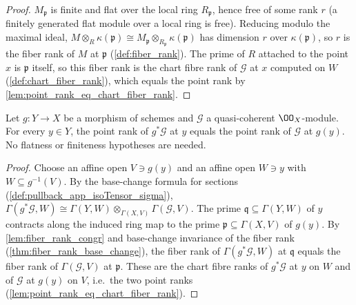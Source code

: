 \begin{proof}
  \leanok
  \(M_{\mathfrak p}\) is finite and flat over the local ring
  \(R_{\mathfrak p}\), hence free of some rank \(r\) (a finitely generated
  flat module over a local ring is free).  Reducing modulo the maximal
  ideal,
  \(M \otimes_R \kappa(\mathfrak p)
    \cong M_{\mathfrak p} \otimes_{R_{\mathfrak p}} \kappa(\mathfrak p)\)
  has dimension \(r\) over \(\kappa(\mathfrak p)\), so \(r\) is the fiber
  rank of \(M\) at \(\mathfrak p\) (\cref{def:fiber_rank}).  The prime of
  \(R\) attached to the point \(x\) is \(\mathfrak p\) itself, so this fiber
  rank is the chart fibre rank of \(\mathcal G\) at \(x\) computed on \(W\)
  (\cref{def:chart_fiber_rank}), which equals the point rank by
  \cref{lem:point_rank_eq_chart_fiber_rank}.
\end{proof}

\begin{theorem}
  \label{thm:point_rank_pullback}
  \leanok
  Let \(g : Y \to X\) be a morphism of schemes and \(\mathcal G\) a
  quasi-coherent \(\OO_X\)-module.  For every \(y \in Y\), the point rank of
  \(g^*\mathcal G\) at \(y\) equals the point rank of \(\mathcal G\) at
  \(g(y)\).  No flatness or finiteness hypotheses are needed.
\end{theorem}

\begin{proof}
  \leanok
  Choose an affine open \(V \ni g(y)\) and an affine open \(W \ni y\) with
  \(W \subseteq g^{-1}(V)\).  By the base-change formula for sections
  (\cref{def:pullback_app_isoTensor_sigma}),
  \(\Gamma(g^*\mathcal G, W) \cong
    \Gamma(Y, W) \otimes_{\Gamma(X, V)} \Gamma(\mathcal G, V)\).  The prime
  \(\mathfrak q \subseteq \Gamma(Y, W)\) of \(y\) contracts along the
  induced ring map to the prime \(\mathfrak p \subseteq \Gamma(X, V)\) of
  \(g(y)\).  By \cref{lem:fiber_rank_congr} and base-change invariance of
  the fiber rank (\cref{thm:fiber_rank_base_change}), the fiber rank of
  \(\Gamma(g^*\mathcal G, W)\) at \(\mathfrak q\) equals the fiber rank of
  \(\Gamma(\mathcal G, V)\) at \(\mathfrak p\).  These are the chart fibre
  ranks of \(g^*\mathcal G\) at \(y\) on \(W\) and of \(\mathcal G\) at
  \(g(y)\) on \(V\), i.e.\ the two point ranks
  (\cref{lem:point_rank_eq_chart_fiber_rank}).
\end{proof}

